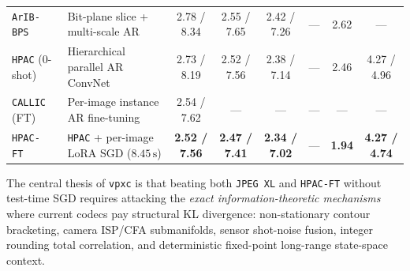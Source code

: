 \begin{table}[htbp]
{\begin{tabular}{@{}llcccccc@{}}
\texttt{ArIB-BPS}~\citep{zhang2024arib} & Bit-plane slice + multi-scale AR & 2.78 / 8.34 & 2.55 / 7.65 & 2.42 / 7.26 & --- & 2.62 & --- \\
\texttt{HPAC} (0-shot)~\citep{hpac2025} & Hierarchical parallel AR ConvNet & 2.73 / 8.19 & 2.52 / 7.56 & 2.38 / 7.14 & --- & 2.46 & 4.27 / 4.96 \\
\texttt{CALLIC} (FT)~\citep{callic2025} & Per-image instance AR fine-tuning & 2.54 / 7.62 & --- & --- & --- & --- & --- \\
\texttt{HPAC-FT}~\citep{hpac2025} & \texttt{HPAC} + per-image LoRA SGD ($8.45\,\mathrm{s}$) & \textbf{2.52 / 7.56} & \textbf{2.47 / 7.41} & \textbf{2.34 / 7.02} & --- & \textbf{1.94} & \textbf{4.27 / 4.74} \\
\bottomrule
\end{tabular}%
}
\end{table}

The central thesis of \texttt{vpxc} is that beating both \texttt{JPEG~XL} and \texttt{HPAC-FT} without test-time SGD requires attacking the \emph{exact information-theoretic mechanisms} where current codecs pay structural KL divergence: non-stationary contour bracketing, camera ISP/CFA submanifolds, sensor shot-noise fusion, integer rounding total correlation, and deterministic fixed-point long-range state-space context.
